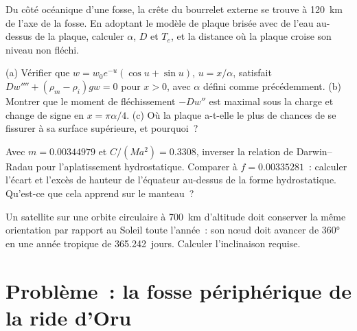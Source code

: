 \begin{exercise}[$\star\star$]\label{exo:b3:gravity-geodesy:9}
Du côté océanique d'une fosse, la crête du bourrelet externe se trouve à \qty{120}{km} de
l'axe de la fosse. En adoptant le modèle de plaque brisée avec de l'eau au-dessus de la plaque, calculer
$\alpha$, $D$ et $T_e$, et la distance où la plaque croise son
niveau non fléchi.
\end{exercise}

\begin{exercise}[$\star\star\star$]\label{exo:b3:gravity-geodesy:10}
(a) Vérifier que $w = w_0e^{-u}(\cos u + \sin u)$, $u = x/\alpha$, satisfait
$Dw'''' + (\rho_m - \rho_i)gw = 0$ pour $x > 0$, avec $\alpha$ défini comme précédemment.
(b) Montrer que le moment de fléchissement $-Dw''$ est maximal sous la charge et change
de signe en $x = \pi\alpha/4$. (c) Où la plaque a-t-elle le plus de chances de se fissurer
à sa surface supérieure, et pourquoi~?
\end{exercise}

\begin{exercise}[$\star\star\star$]\label{exo:b3:gravity-geodesy:11}
Avec $m = \num{0.00344979}$ et $C/(Ma^2) = \num{0.3308}$, inverser la
relation de Darwin--Radau pour l'aplatissement hydrostatique. Comparer à
$f = \num{0.00335281}$~: calculer l'écart et l'excès de hauteur de l'équateur
au-dessus de la forme hydrostatique. Qu'est-ce que cela apprend sur le manteau~?
\end{exercise}

\begin{exercise}[$\star\star\star$]\label{exo:b3:gravity-geodesy:12}
Un satellite sur une orbite circulaire à \qty{700}{km} d'altitude doit conserver la même
orientation par rapport au Soleil toute l'année~: son nœud doit avancer de \ang{360} en
une année tropique de \num{365.242}~jours. Calculer l'inclinaison requise.
\end{exercise}

\section{Problème~: la fosse périphérique de la ride d'Oru}

